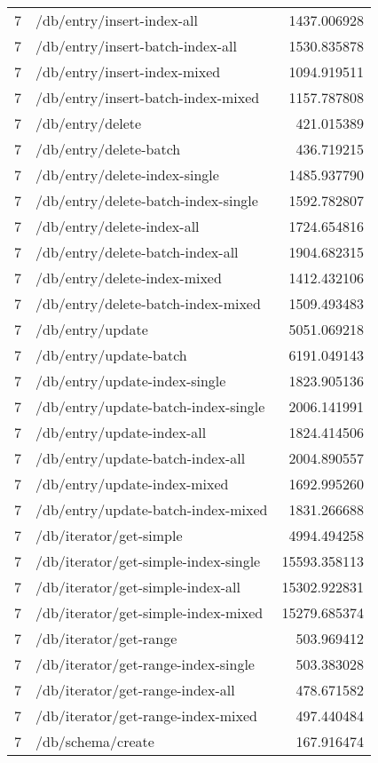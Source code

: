 \begin{longtable}{rlr}
7 & /db/entry/insert-index-all & 1437.006928 \\
7 & /db/entry/insert-batch-index-all & 1530.835878 \\
7 & /db/entry/insert-index-mixed & 1094.919511 \\
7 & /db/entry/insert-batch-index-mixed & 1157.787808 \\
7 & /db/entry/delete & 421.015389 \\
7 & /db/entry/delete-batch & 436.719215 \\
7 & /db/entry/delete-index-single & 1485.937790 \\
7 & /db/entry/delete-batch-index-single & 1592.782807 \\
7 & /db/entry/delete-index-all & 1724.654816 \\
7 & /db/entry/delete-batch-index-all & 1904.682315 \\
7 & /db/entry/delete-index-mixed & 1412.432106 \\
7 & /db/entry/delete-batch-index-mixed & 1509.493483 \\
7 & /db/entry/update & 5051.069218 \\
7 & /db/entry/update-batch & 6191.049143 \\
7 & /db/entry/update-index-single & 1823.905136 \\
7 & /db/entry/update-batch-index-single & 2006.141991 \\
7 & /db/entry/update-index-all & 1824.414506 \\
7 & /db/entry/update-batch-index-all & 2004.890557 \\
7 & /db/entry/update-index-mixed & 1692.995260 \\
7 & /db/entry/update-batch-index-mixed & 1831.266688 \\
7 & /db/iterator/get-simple & 4994.494258 \\
7 & /db/iterator/get-simple-index-single & 15593.358113 \\
7 & /db/iterator/get-simple-index-all & 15302.922831 \\
7 & /db/iterator/get-simple-index-mixed & 15279.685374 \\
7 & /db/iterator/get-range & 503.969412 \\
7 & /db/iterator/get-range-index-single & 503.383028 \\
7 & /db/iterator/get-range-index-all & 478.671582 \\
7 & /db/iterator/get-range-index-mixed & 497.440484 \\
7 & /db/schema/create & 167.916474 \\

\end{longtable}
